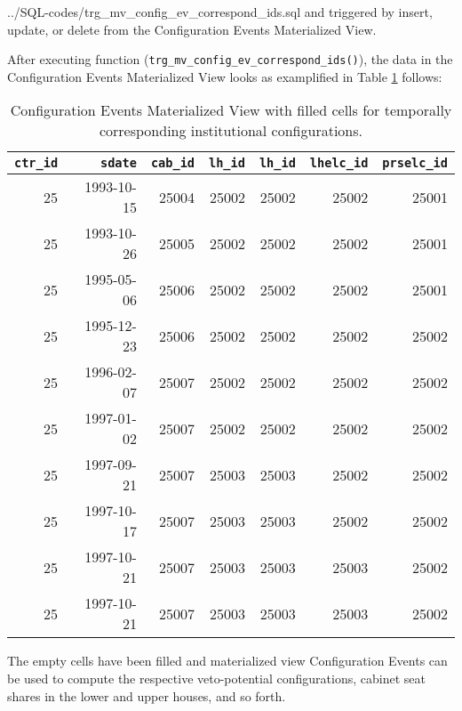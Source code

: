 %
{../SQL-codes/trg_mv_config_ev_correspond_ids.sql}
and triggered by insert, update, or delete from the Configuration Events Materialized View.%

After executing function (\texttt{trg\_mv\_config\_ev\_correspond\_ids()}), the data in the Configuration Events Materialized View looks as examplified in Table \ref{tab_mview_config_events_filled_cells} follows:

\begin{table}[h!]
\centering\footnotesize
\caption{Configuration Events Materialized View with filled cells for temporally corresponding institutional configurations.}
\label{tab_mview_config_events_filled_cells}
\begin{tabular}{r r r r r r r}
\tabularnewline\toprule\toprule
\multicolumn{1}{r}{\texttt{ctr\_id}}	&
\multicolumn{1}{r}{\texttt{sdate}}	&	
\multicolumn{1}{r}{\texttt{cab\_id}}	&
\multicolumn{1}{r}{\texttt{lh\_id}}	&
\multicolumn{1}{r}{\texttt{lh\_id}}	&	
\multicolumn{1}{r}{\texttt{lhelc\_id}}	&	
\multicolumn{1}{r}{\texttt{prselc\_id}}	\\\midrule
25	&	1993-10-15	&	25004	&	25002	&	25002	&	25002	&	25001	\\
25	&	1993-10-26	&	25005	&	25002	&	25002	&	25002	&	25001	\\
25	&	1995-05-06	&	25006	&	25002	&	25002	&	25002	&	25001	\\
25	&	1995-12-23	&	25006	&	25002	&	25002	&	25002	&	25002	\\
25	&	1996-02-07	&	25007	&	25002	&	25002	&	25002	&	25002	\\
25	&	1997-01-02	&	25007	&	25002	&	25002	&	25002	&	25002	\\
25	&	1997-09-21	&	25007	&	25003	&	25003	&	25002	&	25002	\\
25	&	1997-10-17	&	25007	&	25003	&	25003	&	25002	&	25002	\\
25	&	1997-10-21	&	25007	&	25003	&	25003	&	25003	&	25002	\\
25	&	1997-10-21	&	25007	&	25003	&	25003	&	25003	&	25002	\\\bottomrule\bottomrule
\end{tabular}
\end{table}

The empty cells have been filled and materialized view Configuration Events can be used to compute the respective veto-potential configurations, cabinet seat shares in the lower and upper houses, and so forth.
